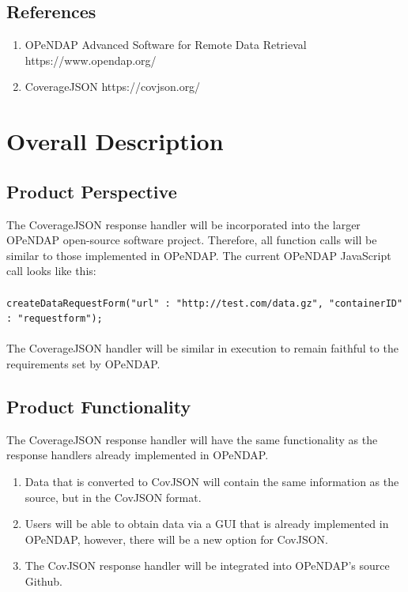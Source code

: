 \documentclass[onecolumn, draftclsnofoot,10pt, compsoc]{IEEEtran}
\begin{document}
\subsection{References}
\begin{enumerate}
\item OPeNDAP Advanced Software for Remote Data Retrieval https://www.opendap.org/
\item CoverageJSON https://covjson.org/
\end{enumerate}


\section{Overall Description}
\subsection{Product Perspective}
The CoverageJSON response handler will be incorporated into the larger OPeNDAP open-source software project. Therefore, all function calls will be similar to those implemented in OPeNDAP. The current OPeNDAP JavaScript call looks like this: 
\\\\
\texttt{createDataRequestForm({"url" : "http://test.com/data.gz", "containerID" : "requestform"});}
\\\\The CoverageJSON handler will be similar in execution to remain faithful to the requirements set by OPeNDAP. 

\subsection{Product Functionality}
The CoverageJSON response handler will have the same functionality as the response handlers already implemented in OPeNDAP.
\begin{enumerate}
\item Data that is converted to CovJSON will contain the same information as the source, but in the CovJSON format. 
\item Users will be able to obtain data via a GUI that is already implemented in OPeNDAP, however, there will be a new option for CovJSON.
\item The CovJSON response handler will be integrated into OPeNDAP's source Github. 
\end{enumerate}
\end{document}
